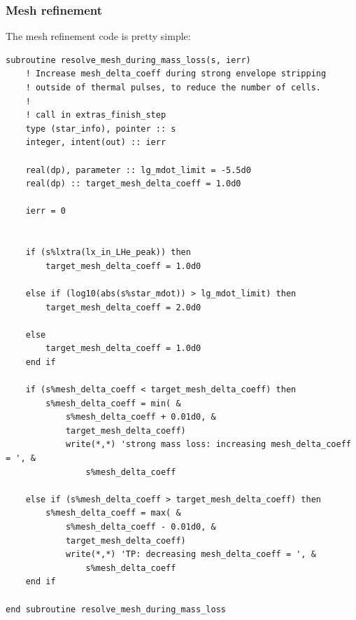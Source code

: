 \documentclass[a4paper,10pt]{article}
\begin{document}
\begin{figure}[ht]
    \centering
\end{figure}

\begin{full}

\subsubsection{Mesh refinement}
The mesh refinement code is pretty simple:

\begin{verbatim}
subroutine resolve_mesh_during_mass_loss(s, ierr)
    ! Increase mesh_delta_coeff during strong envelope stripping
    ! outside of thermal pulses, to reduce the number of cells.
    !
    ! call in extras_finish_step
    type (star_info), pointer :: s
    integer, intent(out) :: ierr

    real(dp), parameter :: lg_mdot_limit = -5.5d0
    real(dp) :: target_mesh_delta_coeff = 1.0d0

    ierr = 0


    if (s%lxtra(lx_in_LHe_peak)) then
        target_mesh_delta_coeff = 1.0d0
    
    else if (log10(abs(s%star_mdot)) > lg_mdot_limit) then
        target_mesh_delta_coeff = 2.0d0
    
    else
        target_mesh_delta_coeff = 1.0d0
    end if
    
    if (s%mesh_delta_coeff < target_mesh_delta_coeff) then
        s%mesh_delta_coeff = min( &
            s%mesh_delta_coeff + 0.01d0, &
            target_mesh_delta_coeff)
            write(*,*) 'strong mass loss: increasing mesh_delta_coeff = ', &
                s%mesh_delta_coeff
    
    else if (s%mesh_delta_coeff > target_mesh_delta_coeff) then
        s%mesh_delta_coeff = max( &
            s%mesh_delta_coeff - 0.01d0, &
            target_mesh_delta_coeff)
            write(*,*) 'TP: decreasing mesh_delta_coeff = ', &
                s%mesh_delta_coeff
    end if

end subroutine resolve_mesh_during_mass_loss
\end{verbatim}
\end{full}
\nextpage
\end{document}
